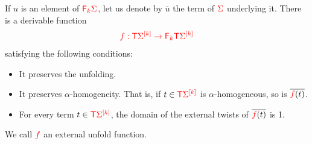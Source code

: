 \begin{lemma}\label{lem:unfold-external-twist} If $u$ is an element of ${\color{red}{{\color{red}{\mathsf F_{k}}}\Sigma}}$, let us denote by $\overline{u}$ the term of ${\color{red}{\Sigma}}$ underlying it. There is a derivable function
\begin{align*}
{\color{red}{f:{\color{red}{\mathsf T}}\Sigma^{{\color{red}{[k]}}} \to {\color{red}{\mathsf F_{k}}}{\color{red}{\mathsf T}}\Sigma^{{\color{red}{[k]}}}}}
\end{align*}
satisfying the following conditions:
\begin{itemize}
\item It preserves the unfolding. 
\item It preserves $\alpha$-homogeneity. That is, if $t\in{\color{red}{{\color{red}{\mathsf T}}{\color{red}{\Sigma}}^{{\color{red}{[k]}}}}}$ is $\alpha$-homogeneous, so is $\overline{{\color{red}{f}}(t)}$.
\item  For every term $t\in {\color{red}{{\color{red}{\mathsf T}}{\color{red}{\Sigma}}^{{\color{red}{[k]}}}}}$, the domain of the external twists of $\overline{{\color{red}{f}}(t)}$ is 1.
\end{itemize}
We call ${\color{red}{f}}$ an external unfold function.
\end{lemma}
